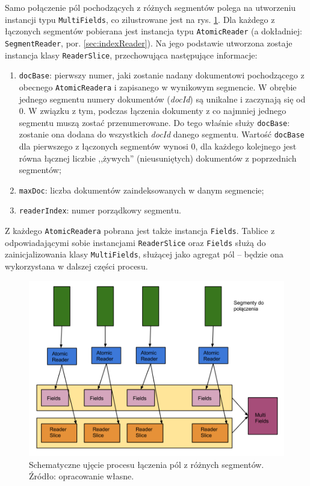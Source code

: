 Samo połączenie pól pochodzących z różnych segmentów polega na utworzeniu instancji typu \texttt{MultiFields}, co zilustrowane jest na rys. \ref{fig:fieldMerge}. Dla każdego z łączonych segmentów pobierana jest instancja typu \texttt{AtomicReader} (a dokładniej: \texttt{SegmentReader}, por. \ref{sec:indexReader}). Na jego podstawie utworzona zostaje instancja klasy \texttt{ReaderSlice}, przechowująca następujące informacje:
\begin{enumerate}
 \item \texttt{docBase}: pierwszy numer, jaki zostanie nadany dokumentowi pochodzącego z obecnego \texttt{AtomicReadera} i zapisanego w wynikowym segmencie. W obrębie jednego segmentu numery dokumentów (\emph{docId}) są unikalne i zaczynają się od 0. W związku z tym, podczas łączenia dokumenty z co najmniej jednego segmentu muszą zostać przenumerowane. Do tego właśnie służy \texttt{docBase}: zostanie ona dodana do wszystkich \emph{docId} danego segmentu. Wartość \texttt{docBase} dla pierwszego z łączonych segmentów wynosi 0, dla każdego kolejnego jest równa łącznej liczbie ,,żywych'' (nieusuniętych) dokumentów z poprzednich segmentów;
 \item \texttt{maxDoc}: liczba dokumentów zaindeksowanych w danym segmencie;
 \item \texttt{readerIndex}: numer porządkowy segmentu.
\end{enumerate}

Z każdego \texttt{AtomicReadera} pobrana jest także instancja \texttt{Fields}. Tablice z odpowiadającymi sobie instancjami \texttt{ReaderSlice} oraz \texttt{Fields} służą do zainicjalizowania klasy \texttt{MultiFields}, służącej jako agregat pól -- będzie ona wykorzystana w dalszej części procesu.

\begin{figure}[here]
 \includegraphics[scale=0.4]{pictures/LaczeniePol.png}
 \caption{Schematyczne ujęcie procesu łączenia pól z różnych segmentów. Źródło: opracowanie własne. \label{fig:fieldMerge}}
\end{figure}

